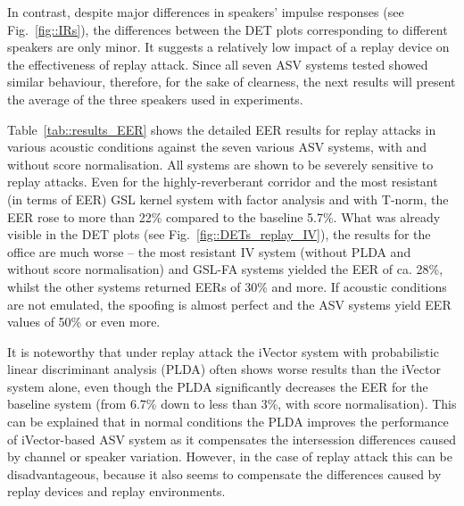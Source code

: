 In contrast, despite major differences in speakers' impulse responses (see Fig.~\ref{fig::IRs}), the differences between the DET plots corresponding to different speakers are only minor. It suggests a relatively low impact of a replay device on the effectiveness of replay attack. Since all seven ASV systems tested showed similar behaviour, therefore, for the sake of clearness, the next results will present the average of the three speakers used in experiments.


Table~\ref{tab::results_EER} shows the detailed EER results for replay attacks in various acoustic conditions against the seven various ASV systems, with and without score normalisation. All systems are shown to be severely sensitive to replay attacks. Even for the highly-reverberant corridor and the most resistant (in terms of EER) GSL kernel system with factor analysis and with T-norm, the EER rose to more than 22\% compared to the baseline 5.7\%. What was already visible in the DET plots (see Fig.~\ref{fig::DETs_replay_IV}), the results for the office are much worse -- the most resistant IV system (without PLDA and without score normalisation) and GSL-FA systems yielded the EER of ca. 28\%, whilst the other systems returned EERs of 30\% and more. If acoustic conditions are not emulated, the spoofing is almost perfect and the ASV systems yield EER values of 50\% or even more. 

It is noteworthy that under replay attack the iVector system with probabilistic linear discriminant analysis (PLDA) often shows worse results than the iVector system alone, even though the PLDA significantly decreases the EER for the baseline system (from 6.7\% down to less than 3\%, with score normalisation). This can be explained that in normal conditions the PLDA improves the performance of iVector-based ASV system as it compensates the intersession differences caused by channel or speaker variation. However, in the case of replay attack this can be disadvantageous, because it also seems to compensate the differences caused by replay devices and replay environments.

